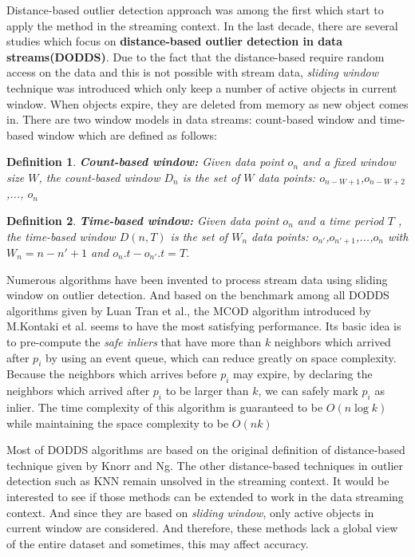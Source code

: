 \documentclass[11pt]{article}       %
\newtheorem{definition}{Definition}
\begin{document}
Distance-based outlier detection approach was among the first which start to apply the method in the streaming context. In the last decade, there are several studies which focus on \textbf{distance-based outlier detection in data streams(DODDS)}. Due to the fact that the distance-based require random access on the data and this is not possible with stream data, \textit{sliding window} technique was introduced which only keep a number of active objects in current window. When objects expire, they are deleted from memory as new object comes in. There are two window models in data streams: count-based window and time-based window which are defined as follows: 

\begin{definition}
 \textbf{Count-based window:} Given data point $o_{n}$ and a fixed window size $W$, the count-based window $D_{n}$ is the set of $W$ data points: $o_{n - W+1}$,$o_{n -W+2}$,..., $o_{n}$
\end{definition}

\begin{definition}
 \textbf{Time-based window:} Given data point $o_{n}$ and a time period $T$ , the time-based window $D(n, T)$ is the set of $W_{n}$ data points: $o_{n'}$,$o_{n'+1}$,...,$o_{n}$ with $W_{n} = n-n' +1$ and $o_{n}.t-o_{n'}.t = T$.
\end{definition}

Numerous algorithms have been invented to process stream data using sliding window on outlier detection. And based on the benchmark among all DODDS algorithms given by Luan Tran et al.\cite{Tran:2016:DOD:2994509.2994526}, the MCOD algorithm introduced by M.Kontaki et al.\cite{5767923} seems to have the most satisfying performance. Its basic idea is to pre-compute the \textit{safe inliers} that have more than $k$ neighbors which arrived after $p_{i}$ by using an event queue, which can reduce greatly on space complexity. Because the neighbors which arrives before $p_{i}$ may expire, by declaring the neighbors which arrived after $p_{i}$ to be larger than $k$, we can safely mark $p_{i}$ as inlier. The time complexity of this algorithm is guaranteed to be $O(n\log{k})$ while maintaining the space complexity to be $O(nk)$

Most of DODDS algorithms are based on the original definition of distance-based technique given by Knorr and Ng\cite{EKnorr:1998}. The other distance-based techniques in outlier detection such as KNN remain unsolved in the streaming context. It would be interested to see if those methods can be extended to work in the data streaming context. And since they are based on \textit{sliding window}, only active objects in current window are considered. And therefore, these methods lack a global view of the entire dataset and sometimes, this may affect accuracy. 
\end{document}
